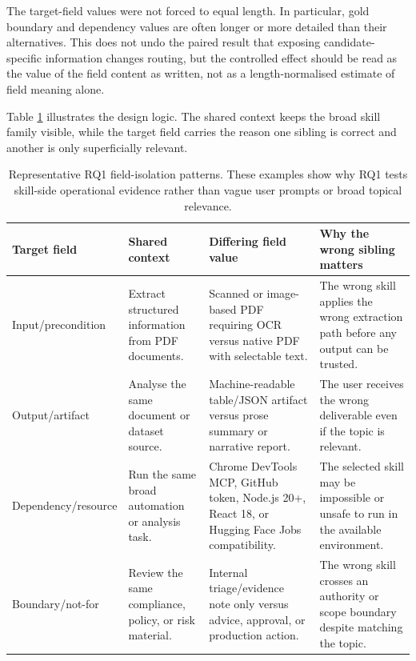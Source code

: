 The target-field values were not forced to equal length. In particular, gold boundary and dependency values are often longer or more detailed than their alternatives. This does not undo the paired result that exposing candidate-specific information changes routing, but the controlled effect should be read as the value of the field content as written, not as a length-normalised estimate of field meaning alone.

\iffalse

Table \ref{tab:rq1-example-patterns} illustrates the design logic. The shared context keeps the broad skill family visible, while the target field carries the reason one sibling is correct and another is only superficially relevant.
\begin{table}[H]
\centering
\scriptsize
\setlength{\tabcolsep}{2pt}
\begin{tabular}{p{}p{}p{}p{}}
\toprule
Target field & Shared context & Differing field value & Why the wrong sibling matters \\
\midrule
Input/precondition & Extract structured information from PDF documents. & Scanned or image-based PDF requiring OCR versus native PDF with selectable text. & The wrong skill applies the wrong extraction path before any output can be trusted. \\
Output/artifact & Analyse the same document or dataset source. & Machine-readable table/JSON artifact versus prose summary or narrative report. & The user receives the wrong deliverable even if the topic is relevant. \\
Dependency/resource & Run the same broad automation or analysis task. & Chrome DevTools MCP, GitHub token, Node.js 20+, React 18, or Hugging Face Jobs compatibility. & The selected skill may be impossible or unsafe to run in the available environment. \\
Boundary/not-for & Review the same compliance, policy, or risk material. & Internal triage/evidence note only versus advice, approval, or production action. & The wrong skill crosses an authority or scope boundary despite matching the topic. \\
\bottomrule
\end{tabular}
\caption{Representative RQ1 field-isolation patterns. These examples show why RQ1 tests skill-side operational evidence rather than vague user prompts or broad topical relevance.}
\label{tab:rq1-example-patterns}
\end{table}

